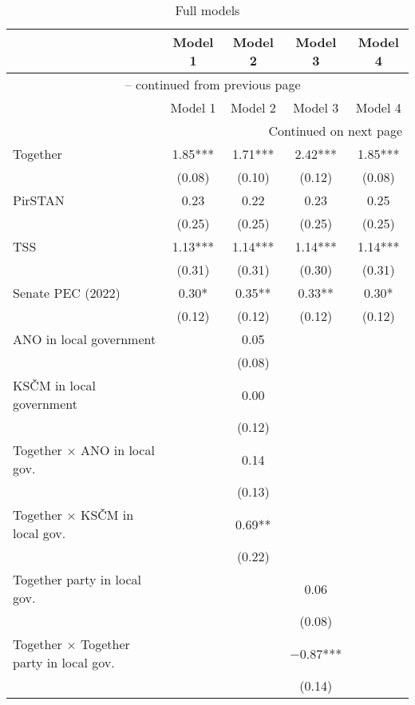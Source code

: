 \begin{longtable}{lcccc}
\caption{Full models}\\
\toprule
  & Model 1 & Model 2 & Model 3 & Model 4\\
\midrule
\endfirsthead

\multicolumn{5}{c}{{\tablename\ \thetable{} -- continued from previous page}} \\
\toprule
  & Model 1 & Model 2 & Model 3 & Model 4\\
\midrule
\endhead

\bottomrule
\multicolumn{5}{r}{{Continued on next page}} \\
\endfoot

\bottomrule
\endlastfoot

Together & \num{1.85}*** & \num{1.71}*** & \num{2.42}*** & \num{1.85}***\\
 & (\num{0.08}) & (\num{0.10}) & (\num{0.12}) & (\num{0.08})\\
PirSTAN & \num{0.23} & \num{0.22} & \num{0.23} & \num{0.25}\\
 & (\num{0.25}) & (\num{0.25}) & (\num{0.25}) & (\num{0.25})\\
TSS & \num{1.13}*** & \num{1.14}*** & \num{1.14}*** & \num{1.14}***\\
 & (\num{0.31}) & (\num{0.31}) & (\num{0.30}) & (\num{0.31})\\
Senate PEC (2022) & \num{0.30}* & \num{0.35}** & \num{0.33}** & \num{0.30}*\\
 & (\num{0.12}) & (\num{0.12}) & (\num{0.12}) & (\num{0.12})\\
ANO in local government &  & \num{0.05} &  & \\
 &  & (\num{0.08}) &  & \\
KSČM in local government &  & \num{0.00} &  & \\
 &  & (\num{0.12}) &  & \\
Together $\times$ ANO in local gov. &  & \num{0.14} &  & \\
 &  & (\num{0.13}) &  & \\
Together $\times$ KSČM in local gov. &  & \num{0.69}** &  & \\
 &  & (\num{0.22}) &  & \\
Together party in local gov. &  &  & \num{0.06} & \\
 &  &  & (\num{0.08}) & \\
Together $\times$ Together party in local gov. &  &  & \num{-0.87}*** & \\
 &  &  & (\num{0.14}) & \\

\end{longtable}
